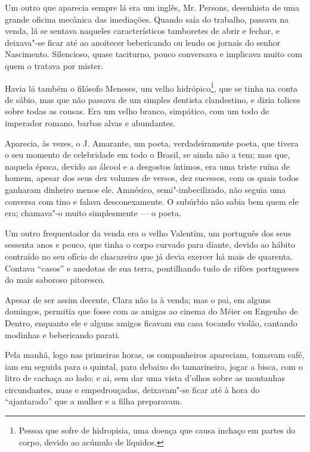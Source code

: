 Um outro que aparecia sempre lá era um inglês, Mr. Persons, desenhista
de uma grande oficina mecânica das imediações. Quando saía do trabalho,
passava na venda, lá se sentava naqueles característicos tamboretes de
abrir e fechar, e deixava"-se ficar até ao anoitecer bebericando ou lendo
os jornais do senhor Nascimento. Silencioso, quase taciturno, pouco
conversava e implicava muito com quem o tratava por mister.

Havia lá também o filósofo Meneses, um velho hidrópico\footnote{Pessoa
  que sofre de hidropisia, uma doença que causa inchaço em partes do
  corpo, devido ao acúmulo de líquidos.}, que se tinha na conta de
sábio, mas que não passava de um simples dentista clandestino, e dizia
tolices sobre todas as cousas. Era um velho branco, simpático, com um
todo de imperador romano, barbas alvas e abundantes.

Aparecia, às vezes, o J. Amarante, um poeta, verdadeiramente poeta, que
tivera o seu momento de celebridade em todo o Brasil, se ainda não a
tem; mas que, naquela época, devido ao álcool e a desgostos íntimos, era
uma triste ruína de homem, apesar dos seus dez volumes de versos, dez
sucessos, com os quais todos ganharam dinheiro menos ele. Amnésico,
semi"-imbecilizado, não seguia uma conversa com tino e falava
desconexamente. O subúrbio não sabia bem quem ele era; chamava"-o muito
simplesmente --- o poeta.

Um outro frequentador da venda era o velho Valentim, um português dos
seus sessenta anos e pouco, que tinha o corpo curvado para diante,
devido ao hábito contraído no seu ofício de chacareiro que já devia
exercer há mais de quarenta. Contava ``casos'' e anedotas de sua terra,
pontilhando tudo de rifões portugueses do mais saboroso pitoresco.

Apesar de ser assim decente, Clara não ia à venda; mas o pai, em alguns
domingos, permitia que fosse com as amigas ao cinema do Méier ou Engenho
de Dentro, enquanto ele e alguns amigos ficavam em casa tocando violão,
cantando modinhas e bebericando parati.

Pela manhã, logo nas primeiras horas, os companheiros apareciam, tomavam
café, iam em seguida para o quintal, para debaixo do tamarineiro, jogar
a bisca, com o litro de cachaça ao lado; e ai, sem dar uma vista d'olhos
sobre as montanhas circundantes, nuas e empedrouçadas, deixavam"-se ficar
até à hora do ``ajantarado'' que a mulher e a filha preparavam.

